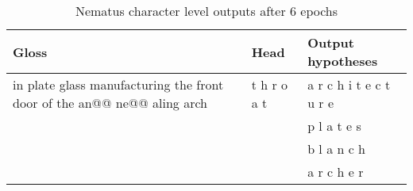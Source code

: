 \documentclass[11pt]{article}
\begin{document}
\begin{spacing}{1}
\begin{table}[!htpb]
\caption{Nematus character level outputs after 6 epochs}
\begin{tabular}{p{8cm} l p{5cm}}
\toprule
Gloss                                                                            & Head            & Output hypotheses                                                                                                                                                                                                                                                                                                                                                                                               \\\midrule
in plate glass manufacturing the front door of the an@@ ne@@ aling arch          & t h r o a t     & a r c h i t e c t u r e                                                                                                                                                                                                                                                                                                                                                                                         \\
                                                                                 &                 & p l a t e s                                                                                                                                                                                                                                                                                                                                                                                                     \\
                                                                                 &                 & b l a n c h                                                                                                                                                                                                                                                                                                                                                                                                     \\
                                                                                 &                 & a r c h e r                                                                                                                                                                                                                                                                                                                                                                                                     \\

\end{tabular}
\end{table}
\end{spacing}
\end{document}
